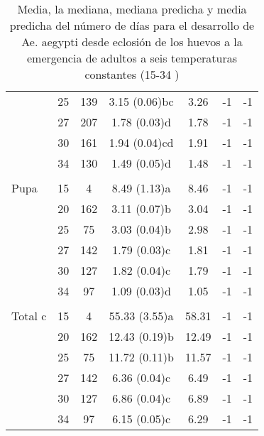 \begin{table}
\begin{center}
\begin{tabular}{p{2cm} c c c c c c }
             & 25 & 139 & 3.15 (0.06)bc & 3.26  & -1 & -1\\ 
             & 27 & 207 & 1.78 (0.03)d  & 1.78  & -1 & -1\\ 
             & 30 & 161 & 1.94 (0.04)cd & 1.91  & -1 & -1\\ 
             & 34 & 130 & 1.49 (0.05)d  & 1.48  & -1 & -1\\ 
\\
Pupa         & 15 & 4   & 8.49 (1.13)a  & 8.46  & -1 & -1\\ 
             & 20 & 162 & 3.11 (0.07)b  & 3.04  & -1 & -1\\ 
             & 25 & 75  & 3.03 (0.04)b  & 2.98  & -1 & -1\\ 
             & 27 & 142 & 1.79 (0.03)c  & 1.81  & -1 & -1\\  
             & 30 & 127 & 1.82 (0.04)c  & 1.79  & -1 & -1\\ 
             & 34 & 97  & 1.09 (0.03)d  & 1.05  & -1 & -1\\ 
\\
Total c      & 15 & 4   & 55.33 (3.55)a & 58.31 & -1 & -1\\ 
             & 20 & 162 & 12.43 (0.19)b & 12.49 & -1 & -1\\ 
             & 25 & 75  & 11.72 (0.11)b & 11.57 & -1 & -1\\ 
             & 27 & 142 & 6.36 (0.04)c  & 6.49  & -1 & -1\\ 
             & 30 & 127 & 6.86 (0.04)c  & 6.89  & -1 & -1\\ 
             & 34 & 97  & 6.15 (0.05)c  & 6.29  & -1 & -1\\ 
\end{tabular}
\caption{ \label{tab:desarrollo-ciclo-temp-test} Media, la mediana, mediana predicha y media predicha
del número de días para el desarrollo de Ae. aegypti desde eclosión de los huevos a la emergencia de
adultos a seis temperaturas constantes (15-34 \textcelsius) \cite{rueda1990temperature}}
\end{center}
\end{table}
